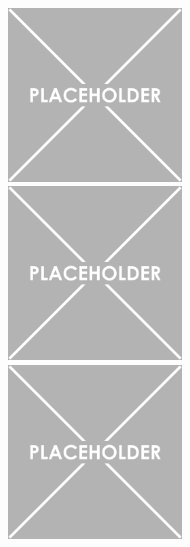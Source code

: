 \documentclass[a4paper, 11pt]{report}
\begin{document}
\begin{figure}[htbp]
\centering
\begin{minipage}[b]{.32\textwidth}
\includegraphics[width=6cm, height=4.6cm]{figs/placeholder.png}
\end{minipage}\hfill
\begin{minipage}[b]{.32\textwidth}
\includegraphics[width=6cm, height=4.6cm]{figs/placeholder.png}
\end{minipage} \hfill
\begin{minipage}[b]{.32\textwidth}
\includegraphics[width=6cm, height=4.6cm]{figs/placeholder.png}
\end{minipage} \hfill \vspace{10pt}


\end{figure}
\end{document}
